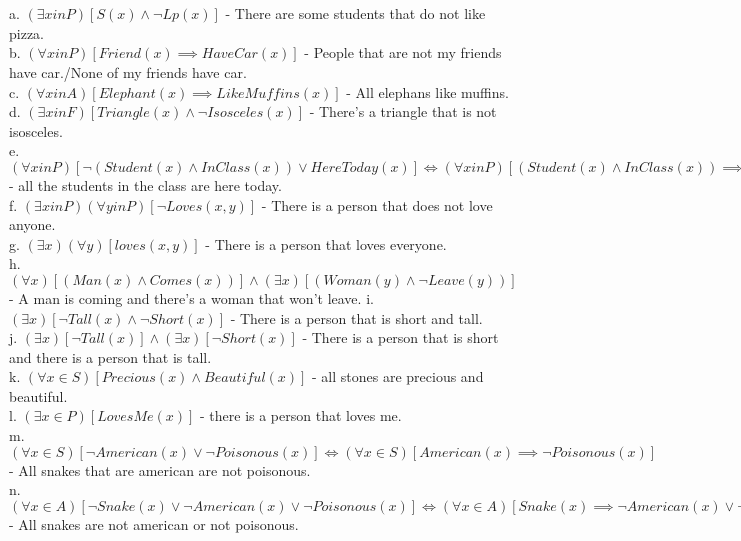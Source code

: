 \documentclass{article}
\begin{document}
\section{}
a. $(\exists x in P)[S(x) \wedge \neg Lp(x)]$ - There are some students that do not like pizza. \\
b. $(\forall x in P)[Friend(x) \implies HaveCar(x)]$ - People that are not my friends have car./None of my friends have car. \\
c. $(\forall x in A)[Elephant(x) \implies LikeMuffins(x)]$ - All elephans like muffins.\\
d. $(\exists x in F)[Triangle(x) \wedge \neg Isosceles(x)]$ - There's a triangle that is not isosceles.\\
e. $(\forall x in P)[\neg (Student(x) \wedge InClass(x)) \vee HereToday(x)] \Leftrightarrow (\forall x in P)[(Student(x) \wedge InClass(x)) \implies HereToday(x)] $ - all the students in the class are here today. \\
f. $(\exists x in P)(\forall y in P)[\neg Loves(x, y)]$ - There is a person that does not love anyone.\\
g. $(\exists x)(\forall y)[loves(x, y)]$ - There is a person that loves everyone. \\
h. $(\forall x)[(Man(x) \wedge Comes(x))] \wedge (\exists x)[(Woman(y) \wedge \neg Leave(y))]$ - A man is coming and there's a woman  that won't leave.
i. $(\exists x)[\neg Tall(x) \wedge \neg Short(x)]$ - There is a person that is short and tall.\\
j. $(\exists x)[\neg Tall(x)] \wedge (\exists x)[\neg Short(x)]$ - There is a person that is short and there is a person that is tall.\\
k. $(\forall x \in S)[Precious(x) \wedge Beautiful(x)]$ - all stones are precious and beautiful.\\
l. $(\exists x \in P)[LovesMe(x)]$ - there is a person that loves me.\\
m. $(\forall x \in S)[\neg American(x) \vee \neg Poisonous(x)] \Leftrightarrow (\forall x \in S)[American(x) \implies \neg Poisonous(x)]$ - All snakes that are american are not poisonous. \\
n. $(\forall x \in A)[\neg Snake(x) \vee \neg American(x) \vee \neg Poisonous(x)] \Leftrightarrow (\forall x \in A)[Snake(x) \implies \neg American(x) \vee \neg Poisonous(x)]$ - All snakes are not american or not poisonous.\\
\end{document}
